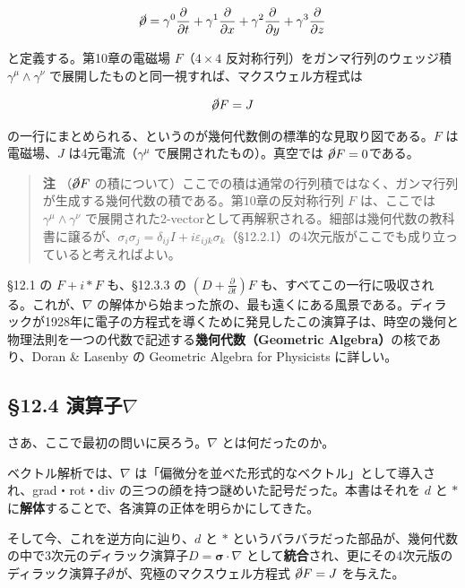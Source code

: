 \documentclass[a4paper,12pt,openany]{book}
\begin{document}
\[\cancel{\partial} = \gamma^0\frac{\partial}{\partial t} + \gamma^1\frac{\partial}{\partial x} + \gamma^2\frac{\partial}{\partial y} + \gamma^3\frac{\partial}{\partial z}\]

と定義する。第10章の電磁場 \(F\)（\(4\times4\)
反対称行列）をガンマ行列のウェッジ積 \(\gamma^\mu\!\wedge\!\gamma^\nu\)
で展開したものと同一視すれば、マクスウェル方程式は

\[\cancel{\partial} F = J\]

の一行にまとめられる、というのが幾何代数側の標準的な見取り図である。\(F\)
は電磁場、\(J\) は4元電流（\(\gamma^\mu\) で展開されたもの）。真空では
\(\cancel{\partial} F = 0\)である。

\begin{quote}
\textbf{注} （\(\cancel{\partial} F\)
の積について）ここでの積は通常の行列積ではなく、ガンマ行列が生成する幾何代数の積である。第10章の反対称行列
\(F\) は、ここでは \(\gamma^\mu\!\wedge\!\gamma^\nu\)
で展開された2-vectorとして再解釈される。細部は幾何代数の教科書に譲るが、\(\sigma_i\sigma_j = \delta_{ij}I + i\varepsilon_{ijk}\sigma_k\)（§12.2.1）の4次元版がここでも成り立っていると考えればよい。
\end{quote}

§12.1 の \(F + i\ast F\) も、§12.3.3 の
\((D + \frac{\partial}{\partial t})F\)
も、すべてこの一行に吸収される。これが、\(\nabla\)
の解体から始まった旅の、最も遠くにある風景である。ディラックが1928年に電子の方程式を導くために発見したこの演算子は、時空の幾何と物理法則を一つの代数で記述する\textbf{幾何代数（Geometric Algebra）}の核であり、Doran
\& Lasenby の Geometric Algebra for Physicists に詳しい。

\hypertarget{ux6f14ux7b97ux5b50nabla}{%
\subsection{\texorpdfstring{§12.4
演算子\(\nabla\)}{§12.4 演算子\textbackslash nabla}}\label{ux6f14ux7b97ux5b50nabla}}

さあ、ここで最初の問いに戻ろう。\(\nabla\) とは何だったのか。

ベクトル解析では、\(\nabla\)
は「偏微分を並べた形式的なベクトル」として導入され、grad・rot・div
の三つの顔を持つ謎めいた記号だった。本書はそれを \(d\) と \(\ast\)
に\textbf{解体}することで、各演算の正体を明らかにしてきた。

そして今、これを逆方向に辿り、\(d\) と \(\ast\)
というバラバラだった部品が、幾何代数の中で3次元のディラック演算子\(D = \bm{\sigma}\!\cdot\!\nabla\)
として\textbf{統合}され、更にその4次元版のディラック演算子\(\cancel{\partial}\)が、究極のマクスウェル方程式
\(\cancel{\partial} F = J\) を与えた。
\end{document}
